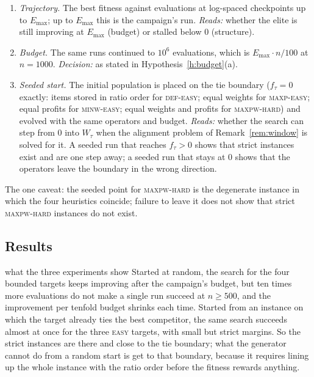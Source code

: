 \documentclass[a4paper,11pt]{article}
\newcommand{\Emax}{E_{\max}}
\newcommand{\DEF}{\textsc{def}}
\newcommand{\MAXP}{\textsc{maxp}}
\newcommand{\MAXPW}{\textsc{maxpw}}
\newcommand{\MINW}{\textsc{minw}}
\theoremstyle{plain}
\theoremstyle{definition}
\theoremstyle{remark}
\begin{document}
\begin{enumerate}[label=\textbf{E\arabic*},leftmargin=3em,itemsep=3pt]
\item \emph{Trajectory.} The best fitness against evaluations at log-spaced checkpoints up
to $\Emax$; up to $\Emax$ this is the campaign's run. \emph{Reads:} whether the elite is still
improving at $\Emax$ (budget) or stalled below $0$ (structure).
\item \emph{Budget.} The same runs continued to $10^{6}$ evaluations, which is
$\Emax\cdot n/100$ at $n=1000$. \emph{Decision:} as stated in Hypothesis~\ref{h:budget}(a).
\item \emph{Seeded start.} The initial population is placed on the tie boundary
($f_\tau=0$ exactly: items stored in ratio order for \DEF-\textsc{easy}; equal weights for
\MAXP-\textsc{easy}; equal profits for \MINW-\textsc{easy}; equal weights and profits for
\MAXPW-\textsc{hard}) and evolved with the same operators and budget. \emph{Reads:} whether
the search can step from $0$ into $W_\tau$ when the alignment problem of
Remark~\ref{rem:window} is solved for it. A seeded run that reaches $f_\tau>0$ shows that
strict instances exist and are one step away; a seeded run that stays at $0$ shows that the
operators leave the boundary in the wrong direction.
\end{enumerate}

The one caveat: the seeded point for \MAXPW-\textsc{hard} is the degenerate instance in which
the four heuristics coincide; failure to leave it does not show that strict
\MAXPW-\textsc{hard} instances do not exist.

\subsection*{Results}

\begin{plain}{what the three experiments show}
Started at random, the search for the four bounded targets keeps improving after the
campaign's budget, but ten times more evaluations do not make a single run succeed at
$n\ge500$, and the improvement per tenfold budget shrinks each time. Started from an instance
on which the target already ties the best competitor, the same search succeeds almost at
once for the three \textsc{easy} targets, with small but strict margins. So the strict
instances are there and close to the tie boundary; what the generator cannot do from a
random start is get to that boundary, because it requires lining up the whole instance with
the ratio order before the fitness rewards anything.
\end{plain}
\end{document}
